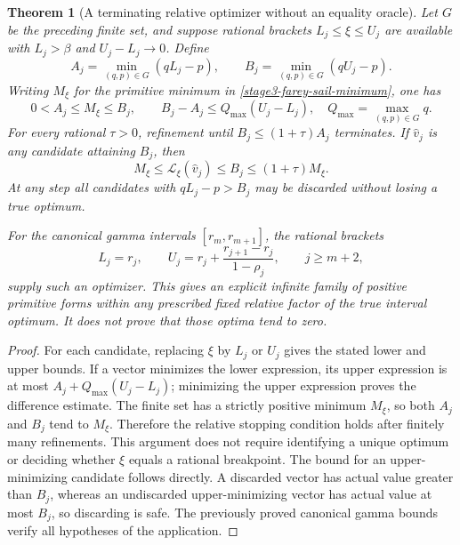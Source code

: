 \documentclass[11pt,a4paper]{article}
\newtheorem{theorem}{Theorem}[section]
\theoremstyle{definition}
\theoremstyle{remark}
\begin{document}
\begin{theorem}[A terminating relative optimizer without an equality oracle]
\label{stage3-farey-certified-optimizer}
Let $G$ be the preceding finite set, and suppose rational brackets
$L_j\le\xi\le U_j$ are available with $L_j>\beta$ and
$U_j-L_j\to0$. Define
\[
 A_j=\min_{(q,p)\in G}(qL_j-p),\qquad
 B_j=\min_{(q,p)\in G}(qU_j-p).
\]
Writing $M_\xi$ for the primitive minimum in
\eqref{stage3-farey-sail-minimum}, one has
\[
 0<A_j\le M_\xi\le B_j,\qquad
 B_j-A_j\le Q_{\max}(U_j-L_j),
 \quad Q_{\max}=\max_{(q,p)\in G}q.
\]
For every rational $\tau>0$, refinement until
$B_j\le(1+\tau)A_j$ terminates. If $\widehat v_j$ is any candidate
attaining $B_j$, then
\[
 M_\xi\le\mathcal L_\xi(\widehat v_j)
 \le B_j\le(1+\tau)M_\xi.
\]
At any step all candidates with $qL_j-p>B_j$ may be discarded without
losing a true optimum.

For the canonical gamma intervals $[r_m,r_{m+1}]$, the rational
brackets
\[
 L_j=r_j,\qquad
 U_j=r_j+\frac{r_{j+1}-r_j}{1-\rho_j},
 \qquad j\ge m+2,
\]
supply such an optimizer. This gives an explicit infinite family of
positive primitive forms within any prescribed fixed relative factor
of the true interval optimum. It does not prove that those optima
tend to zero.
\end{theorem}

\begin{proof}
For each candidate, replacing $\xi$ by $L_j$ or $U_j$ gives the stated
lower and upper bounds. If a vector minimizes the lower expression, its
upper expression is at most
$A_j+Q_{\max}(U_j-L_j)$; minimizing the upper expression proves the
difference estimate. The finite set has a strictly positive minimum
$M_\xi$, so both $A_j$ and $B_j$ tend to $M_\xi$. Therefore the relative
stopping condition holds after finitely many refinements. This argument
does not require identifying a unique optimum or deciding whether
$\xi$ equals a rational breakpoint. The bound for an upper-minimizing
candidate follows directly. A discarded vector has actual value greater
than $B_j$, whereas an undiscarded upper-minimizing vector has actual
value at most $B_j$, so discarding is safe. The previously proved
canonical gamma bounds verify all hypotheses of the application.
\end{proof}
\end{document}
